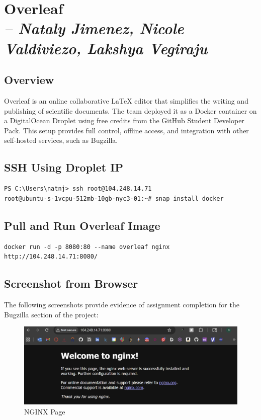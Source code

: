 \chapter{Overleaf \\
\small{\textit{-- Nataly Jimenez, Nicole Valdiviezo, Lakshya Vegiraju}}
\label{Chapter::Overleaf}}

\section{Overview}
Overleaf is an online collaborative \LaTeX{} editor that simplifies the writing and publishing of scientific documents. The team deployed it as a Docker container on a DigitalOcean Droplet using free credits from the GitHub Student Developer Pack. This setup provides full control, offline access, and integration with other self-hosted services, such as Bugzilla.

\section{SSH Using Droplet IP}
\begin{verbatim}
PS C:\Users\natnj> ssh root@104.248.14.71
root@ubuntu-s-1vcpu-512mb-10gb-nyc3-01:~# snap install docker
\end{verbatim}

\section{Pull and Run Overleaf Image}
\begin{verbatim}
docker run -d -p 8080:80 --name overleaf nginx
http://104.248.14.71:8080/
\end{verbatim}

\section{Screenshot from Browser}
The following screenshots provide evidence of assignment completion for the Bugzilla section of the project:

\begin{figure}[ht]
    \centering
    \includegraphics[width=0.6\linewidth]{Book_SSW590_1/eps/Screenshots/Overleaf_6.png}
    \caption{NGINX Page}
    \label{NGINX Page}
\end{figure}
